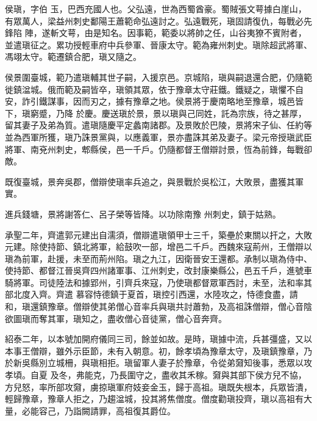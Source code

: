 
\begin{pinyinscope}

 侯瑱，字伯
 玉，巴西充國人也。父弘遠，世為西蜀酋豪。蜀賊張文萼據白崖山，有眾萬人，梁益州刺史鄱陽王蕭範命弘遠討之。弘遠戰死，瑱固請復仇，每戰必先鋒陷
 陣，遂斬文萼，由是知名。因事範，範委以將帥之任，山谷夷獠不賓附者，並遣瑱征之。累功授輕車府中兵參軍、晉康太守。範為雍州刺史。瑱除超武將軍、馮翊太守。範遷鎮合肥，瑱又隨之。



 侯景圍臺城，範乃遣瑱輔其世子嗣，入援京邑。京城陷，瑱與嗣退還合肥，仍隨範徙鎮湓城。俄而範及嗣皆卒，瑱領其眾，依于豫章太守莊鐵。鐵疑之，瑱懼不自安，詐引鐵謀事，因而刃之，據有豫章之地。侯景將于慶南略地至豫章，城邑皆下，瑱窮蹙，乃降
 於慶。慶送瑱於景，景以瑱與己同姓，託為宗族，待之甚厚，留其妻子及弟為質。遣瑱隨慶平定蠡南諸郡。及景敗於巴陵，景將宋子仙、任約等並為西軍所獲，瑱乃誅景黨與，以應義軍，景亦盡誅其弟及妻子。梁元帝授瑱武臣將軍、南兗州刺史，郫縣侯，邑一千戶。仍隨都督王僧辯討景，恆為前鋒，每戰卻敵。



 既復臺城，景奔吳郡，僧辯使瑱率兵追之，與景戰於吳松江，大敗景，盡獲其軍實。



 進兵錢塘，景將謝答仁、呂子榮等皆降。以功除南豫
 州刺史，鎮于姑熟。



 承聖二年，齊遣郭元建出自濡須，僧辯遣瑱領甲士三千，築壘於東關以扞之，大敗元建。除使持節、鎮北將軍，給鼓吹一部，增邑二千戶。西魏來寇荊州，王僧辯以瑱為前軍，赴援，未至而荊州陷。瑱之九江，因衛晉安王還都。承制以瑱為侍中、使持節、都督江晉吳齊四州諸軍事、江州刺史，改封康樂縣公，邑五千戶，進號車騎將軍。司徒陸法和據郢州，引齊兵來寇，乃使瑱都督眾軍西討，未至，法和率其部北度入齊。齊遣
 慕容恃德鎮于夏首，瑱控引西還，水陸攻之，恃德食盡，請和，瑱還鎮豫章。僧辯使其弟僧心音率兵與瑱共討蕭勃，及高祖誅僧辯，僧心音陰欲圖瑱而奪其軍，瑱知之，盡收僧心音徒黨，僧心音奔齊。



 紹泰二年，以本號加開府儀同三司，餘並如故。是時，瑱據中流，兵甚彊盛，又以本事王僧辯，雖外示臣節，未有入朝意。初，餘孝頃為豫章太守，及瑱鎮豫章，乃於新吳縣別立城柵，與瑱相拒。瑱留軍人妻子於豫章，令從弟奫知後事，悉眾以攻孝頃。自夏
 及冬，弗能克，乃長圍守之，盡收其禾稼。奫與其部下侯方兒不協，方兒怒，率所部攻奫，虜掠瑱軍府妓妾金玉，歸于高祖。瑱既失根本，兵眾皆潰，輕歸豫章，豫章人拒之，乃趨湓城，投其將焦僧度。僧度勸瑱投齊，瑱以高祖有大量，必能容己，乃詣闕請罪，高祖復其爵位。




\end{pinyinscope}
